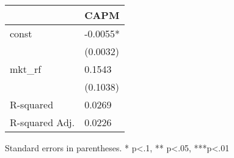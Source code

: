 \begin{table}
\caption{}
\label{}
\begin{center}
\begin{tabular}{ll}
\hline
               & CAPM      \\
\hline
const          & -0.0055*  \\
               & (0.0032)  \\
mkt\_rf        & 0.1543    \\
               & (0.1038)  \\
R-squared      & 0.0269    \\
R-squared Adj. & 0.0226    \\
\hline
\end{tabular}
\end{center}
\end{table}
\bigskip
Standard errors in parentheses. \newline 
* p<.1, ** p<.05, ***p<.01